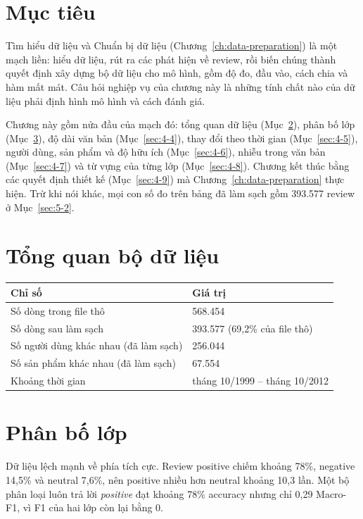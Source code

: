 \section{Mục tiêu}
\label{sec:4-1}

Tìm hiểu dữ liệu và Chuẩn bị dữ liệu (Chương~\ref{ch:data-preparation}) là một mạch liền: hiểu dữ liệu, rút ra các phát hiện về review, rồi biến chúng thành quyết định xây dựng bộ dữ liệu cho mô hình, gồm độ đo, đầu vào, cách chia và hàm mất mát. Câu hỏi nghiệp vụ của chương này là những tính chất nào của dữ liệu phải định hình mô hình và cách đánh giá.

Chương này gồm nửa đầu của mạch đó: tổng quan dữ liệu (Mục~\ref{sec:4-2}), phân bố lớp (Mục~\ref{sec:4-3}), độ dài văn bản (Mục~\ref{sec:4-4}), thay đổi theo thời gian (Mục~\ref{sec:4-5}), người dùng, sản phẩm và độ hữu ích (Mục~\ref{sec:4-6}), nhiễu trong văn bản (Mục~\ref{sec:4-7}) và từ vựng của từng lớp (Mục~\ref{sec:4-8}). Chương kết thúc bằng các quyết định thiết kế (Mục~\ref{sec:4-9}) mà Chương~\ref{ch:data-preparation} thực hiện. Trừ khi nói khác, mọi con số đo trên bảng đã làm sạch gồm 393.577 review ở Mục~\ref{sec:5-2}.

\section{Tổng quan bộ dữ liệu}
\label{sec:4-2}

\begin{center}
\begin{tabular}{@{}p{6cm}p{7.5cm}@{}}
    \toprule
    Chỉ số & Giá trị \\
    \midrule
    Số dòng trong file thô & 568.454 \\
    Số dòng sau làm sạch & 393.577 (69,2\% của file thô) \\
    Số người dùng khác nhau (đã làm sạch) & 256.044 \\
    Số sản phẩm khác nhau (đã làm sạch) & 67.554 \\
    Khoảng thời gian & tháng 10/1999 -- tháng 10/2012 \\
    \bottomrule
\end{tabular}
\end{center}

\section{Phân bố lớp}
\label{sec:4-3}

Dữ liệu lệch mạnh về phía tích cực. Review positive chiếm khoảng 78\%, negative 14,5\% và neutral 7,6\%, nên positive nhiều hơn neutral khoảng 10,3 lần. Một bộ phân loại luôn trả lời \emph{positive} đạt khoảng 78\% accuracy nhưng chỉ 0,29 Macro-F1, vì F1 của hai lớp còn lại bằng 0.

